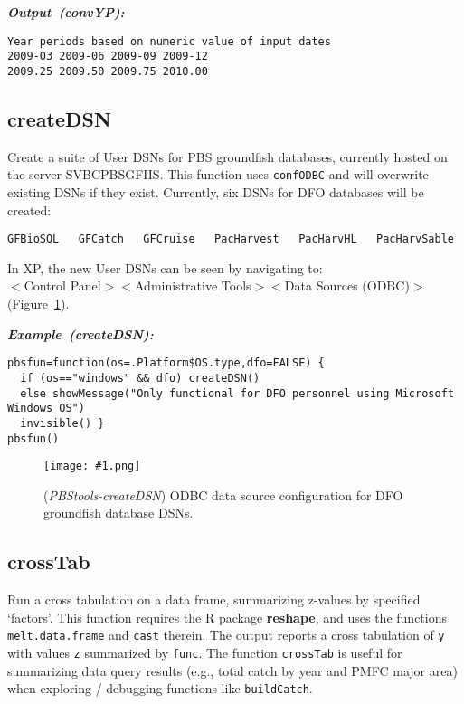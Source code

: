 \documentclass[letterpaper,12pt,fleqn]{article}
\def\tab{\hspace{0.5 in}}
\newcommand{\code}[1]{\small\texttt{#1}\normalsize}
\newcommand{\pkg}[1]{{\bf #1}}
\newcommand{\sQuote}[1]{`#1'}
\newcommand{\gui}[1]{\small\textmd{\textsf{#1}}\normalsize}
\newcommand{\db}[1]{\small\textmd{\textsf{#1}}\normalsize}
\newcommand\pbsfig[4]{    %
	\begin{figure}[ht!] %
	\centering
	\texttt{[image: \#1.png]}
	\ifthenelse{\isempty{#4}}
		{\caption[#2]{(\emph{#1}) #2}\vspace{-2ex}}
		{\caption[#4]{(\emph{#1}) #2}\vspace{-2ex}}
	\label{fig:#1}
	\end{figure}
}
\newcommand\example[1]{    %
	\textbf{\emph{Example~(#1):}}\\ \vspace{3 pt}
}
\newcommand\results[1]{    %
	\textbf{\emph{Output~(#1):}}\\ \vspace{3 pt}
}
\begin{document}
\begin{outputbox}
\results{convYP}
\begin{Verbatim}[fontsize=\footnotesize]
Year periods based on numeric value of input dates
2009-03 2009-06 2009-09 2009-12 
2009.25 2009.50 2009.75 2010.00
\end{Verbatim}
\end{outputbox}

\subsection {createDSN}

\tab Create a suite of User DSNs for PBS groundfish databases, currently hosted on the server \db{SVBCPBSGFIIS}. This function uses \code{confODBC} and will overwrite existing DSNs if they exist. Currently, six DSNs for DFO databases will be created:

\begin{Verbatim}[fontsize=\footnotesize]
GFBioSQL   GFCatch   GFCruise   PacHarvest   PacHarvHL   PacHarvSable
\end{Verbatim}

In XP, the new User DSNs can be seen by navigating to: \\
\gui{$<$Control Panel$><$Administrative Tools$><$Data Sources (ODBC)$>$} (Figure~\ref{fig:PBStools-createDSN}).

\begin{examplebox}
\example{createDSN}
\begin{Verbatim}[fontsize=\footnotesize]
pbsfun=function(os=.Platform$OS.type,dfo=FALSE) {
  if (os=="windows" && dfo) createDSN() 
  else showMessage("Only functional for DFO personnel using Microsoft Windows OS")
  invisible() }
pbsfun()
\end{Verbatim}
\end{examplebox}
\pbsfig{PBStools-createDSN}{ODBC data source configuration for DFO groundfish database DSNs.}{3.25}{}

\subsection {crossTab}

\tab Run a cross tabulation on a data frame, summarizing z-values by specified \sQuote{factors}.
This function requires the R package \pkg{reshape}, and uses the functions \code{melt.data.frame} and \code{cast} therein.
The output reports a cross tabulation of \code{y} with values \code{z} summarized by \code{func}.
The function \code{crossTab} is useful for summarizing data query results (e.g., total catch by year and PMFC major area) when exploring / debugging functions like \code{buildCatch}.
\end{document}
